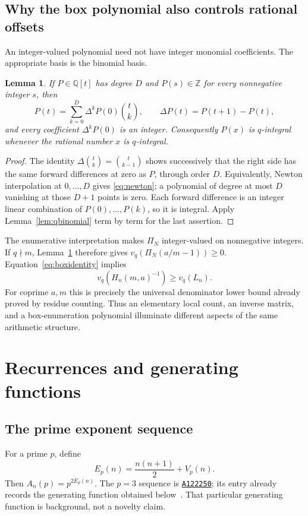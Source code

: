 \documentclass[11pt,a4paper]{article}
\numberwithin{equation}{section}
\newtheorem{lemma}[theorem]{Lemma}
\theoremstyle{definition}
\theoremstyle{remark}
\newcommand{\Z}{\mathbb{Z}}
\newcommand{\Q}{\mathbb{Q}}
\newcommand{\PP}{\Pi}
\newcommand{\OEIS}[1]{\href{https://oeis.org/#1}{\texttt{#1}}}
\begin{document}
\subsection{Why the box polynomial also controls rational offsets}
An integer-valued polynomial need not have integer monomial coefficients. The appropriate basis is the binomial basis.

\begin{lemma}\label{lem:intpoly}
If $P\in\Q[t]$ has degree $D$ and $P(s)\in\Z$ for every nonnegative integer $s$, then
\begin{equation}\label{eq:newton}
 P(t)=\sum_{k=0}^D\Delta^kP(0)\binom{t}{k},
 \qquad \Delta P(t)=P(t+1)-P(t),
\end{equation}
and every coefficient $\Delta^kP(0)$ is an integer. Consequently $P(x)$ is $q$-integral whenever the rational number $x$ is $q$-integral.
\end{lemma}
\begin{proof}
The identity $\Delta\binom{t}{k}=\binom{t}{k-1}$ shows successively that the right side has the same forward differences at zero as $P$, through order $D$. Equivalently, Newton interpolation at $0,\ldots,D$ gives \eqref{eq:newton}; a polynomial of degree at most $D$ vanishing at those $D+1$ points is zero. Each forward difference is an integer linear combination of $P(0),\ldots,P(k)$, so it is integral. Apply Lemma~\ref{lem:qbinomial} term by term for the last assertion.
\end{proof}

The enumerative interpretation makes $\PP_N$ integer-valued on nonnegative integers. If $q\nmid m$, Lemma~\ref{lem:intpoly} therefore gives
$v_q(\PP_N(a/m-1))\geq0$. Equation~\eqref{eq:boxidentity} implies
\[
 v_q(H_n(m,a)^{-1})\geq v_q(L_n).
\]
For coprime $a,m$ this is precisely the universal denominator lower bound already proved by residue counting. Thus an elementary local count, an inverse matrix, and a box-enumeration polynomial illuminate different aspects of the same arithmetic structure.

\section{Recurrences and generating functions}\label{sec:sequences}

\subsection{The prime exponent sequence}
For a prime $p$, define
\begin{equation}\label{eq:Ep}
 E_p(n)=\frac{n(n+1)}2+V_p(n).
\end{equation}
Then $A_n(p)=p^{2E_p(n)}$. The $p=3$ sequence is \OEIS{A122250}; its entry already records the generating function obtained below~\cite{oeis250}. That particular generating function is background, not a novelty claim.
\end{document}
